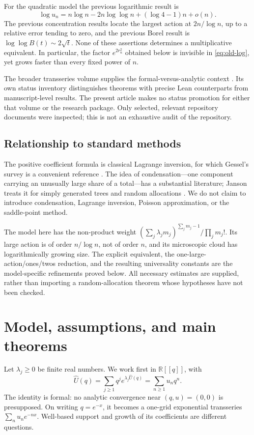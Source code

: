 \documentclass[11pt,a4paper]{article}
\theoremstyle{definition}
\newcommand{\R}{\mathbb R}
\newcommand{\U}{\widehat U}
\numberwithin{equation}{section}
\begin{document}
For the quadratic model the previous logarithmic result is
\begin{equation}
 \log u_n=n\log n-2n\log\log n+(\log4-1)n+o(n).
 \label{eq:old-log}
\end{equation}
The previous concentration results locate the largest action at
\(2n/\log n\), up to a relative error tending to zero, and the previous Borel
result is \(\log\log B(t)\sim2\sqrt t\).
None of these assertions determines a multiplicative equivalent. In
particular, the factor \(e^{2r_n^2}\) obtained below is invisible in
\eqref{eq:old-log}, yet grows faster than every fixed power of \(n\).

The broader transseries volume supplies the formal-versus-analytic context
\cite{repo-volume}. Its own status inventory distinguishes theorems with
precise Lean counterparts from manuscript-level results. The present article
makes no status promotion for either that volume or the research package.
Only selected, relevant repository documents were inspected; this is not an
exhaustive audit of the repository.

\subsection{Relationship to standard methods}
The positive coefficient formula is classical Lagrange inversion, for which
Gessel's survey is a convenient reference \cite{gessel}. The idea of
condensation---one component carrying an unusually large share of a total---has
a substantial literature; Janson treats it for simply generated trees and
random allocations \cite{janson}. We do not claim to introduce condensation,
Lagrange inversion, Poisson approximation, or the saddle-point method.

The model here has the non-product weight
\((\sum_j\lambda_jm_j)^{\sum_jm_j-1}/\prod_jm_j!\).
Its large action is of order \(n/\log n\), not of order \(n\), and its
microscopic cloud has logarithmically growing size. The explicit equivalent,
the one-large-action/ones/twos reduction, and the resulting universality
constants are the model-specific refinements proved below. All necessary
estimates are supplied, rather than importing a random-allocation theorem
whose hypotheses have not been checked.

\section{Model, assumptions, and main theorems}
\label{sec:main}
Let \(\lambda_j\ge0\) be finite real numbers. We work first in
\(\R[[q]]\), with
\begin{equation}
 \U(q)=\sum_{j\ge1}q^j e^{\lambda_j\U(q)}
       =\sum_{n\ge1}u_nq^n.
 \label{eq:model}
\end{equation}
The identity is formal: no analytic convergence near \((q,u)=(0,0)\) is
presupposed. On writing \(q=e^{-x}\), it becomes a one-grid exponential
transseries \(\sum_nu_ne^{-nx}\). Well-based support and growth of its
coefficients are different questions.
\end{document}
